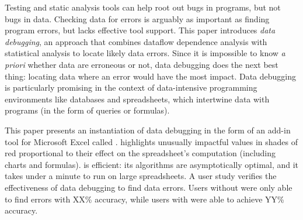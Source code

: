 Testing and static analysis tools can help root out bugs in programs,
but not bugs in data. Checking data for errors is arguably as
important as finding program errors, but lacks effective tool
support. This paper introduces \emph{data debugging}, an approach that
combines dataflow dependence analysis with statistical analysis to
locate likely data errors. Since it is impossible to know \emph{a
priori} whether data are erroneous or not, data debugging does the
next best thing: locating data where an error would have the most
impact. Data debugging is particularly promising in the context of
data-intensive programming environments like databases and
spreadsheets, which intertwine data with programs (in the form of
queries or formulas).

This paper presents an instantiation of data debugging in the form of an add-in
tool for Microsoft Excel called \checkcell{}. \checkcell{} highlights
unusually impactful values in shades of red proportional to their
effect on the spreadsheet's computation (including charts and 
formulas). \checkcell{} is efficient: its algorithms are asymptotically
optimal, and it takes under a minute to run on large spreadsheets. A
user study verifies the effectiveness of data debugging to find
data errors. Users without \checkcell{} were only able to find errors with XX\%
accuracy, while users with \checkcell{} were able to achieve YY\% accuracy.

